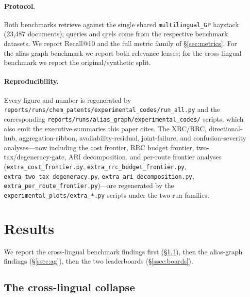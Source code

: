 \documentclass[11pt]{article}
\begin{document}
\paragraph{Protocol.}
Both benchmarks retrieve against the single shared \texttt{multilingual\_GP}
haystack (23{,}487 documents); queries and qrels come from the respective
benchmark datasets. We report Recall@10 and the full metric family of
\S\ref{sec:metrics}. For the alias-graph benchmark we report both relevance
lenses; for the cross-lingual benchmark we report the original/synthetic split.

\paragraph{Reproducibility.}
Every figure and number is regenerated by
\texttt{reports/runs/chem\_patents/experimental\_codes/run\_all.py} and the
corresponding \texttt{reports/runs/alias\_graph/experimental\_codes/} scripts,
which also emit the executive summaries this paper cites. The XRC/RRC,
directional-hub, aggregation-ribbon, availability-residual, joint-failure, and
confusion-severity analyses---now including the cost frontier, RRC budget
frontier, two-tax/degeneracy-gate, ARI decomposition, and per-route frontier
analyses (\texttt{extra\_cost\_frontier.py},
\texttt{extra\_rrc\_budget\_frontier.py},
\texttt{extra\_two\_tax\_degeneracy.py}, \texttt{extra\_ari\_decomposition.py},
\texttt{extra\_per\_route\_frontier.py})---are regenerated by the
\texttt{experimental\_plots/extra\_*.py} scripts under the two run families.

\section{Results}
\label{sec:results}

We report the cross-lingual benchmark findings first (\S\ref{ssec:cp}), then
the alias-graph findings (\S\ref{ssec:ag}), then the two leaderboards
(\S\ref{ssec:boards}).

\subsection{The cross-lingual collapse}
\label{ssec:cp}
\end{document}
